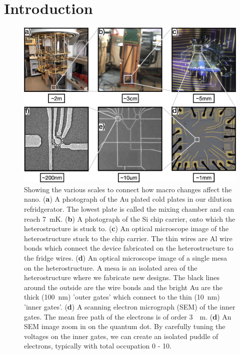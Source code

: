 \chapter{Introduction}\label{cha:intro}


\begin{figure}[!htb]
  \begin{center}
    \includegraphics[width=1.0\textwidth]{figures/ch1/crop_FiguresMaster.001.png}
    \caption[Dilution fridge to quantum dot scale breakdown]{\label{fig:ch1/scale_breakdown} 
    Showing the various scales to connect how macro changes affect the nano. (\textbf{a}) A photograph of the Au plated cold plates in our dilution refridgerator. The lowest plate is called the mixing chamber and can reach \qty{7}{mK}. (\textbf{b}) A photograph of the Si chip carrier, onto which the heterostructure is stuck to. (\textbf{c}) An optical microscope image of the heterostructure stuck to the chip carrier. The thin wires are Al wire bonds which connect the device fabricated on the heterostructure to the fridge wires. (\textbf{d}) An optical microscope image of a single mesa on the heterostructure. A mesa is an isolated area of the heterostructure where we fabricate new designs. The black lines around the outside are the wire bonds and the bright Au are the thick (\qty{100}{nm}) 'outer gates' which connect to the thin (\qty{10}{nm}) 'inner gates'. (\textbf{d}) A scanning electron micrograph (SEM) of the inner gates. The mean free path of the electrons is of order \qty{3}{\mu m}.  (\textbf{d}) An SEM image zoom in on the quantum dot. By carefully tuning the voltages on the inner gates, we can create an isolated puddle of electrons, typically with total occupation 0 - 10.  
      }
  \end{center}
\end{figure}


